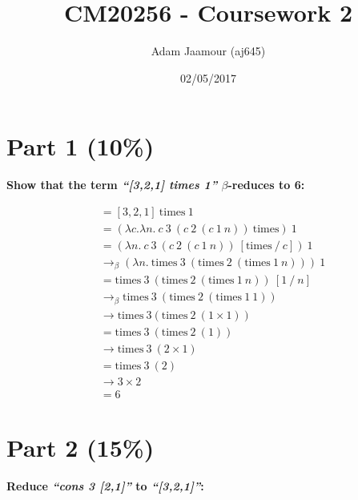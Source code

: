 \documentclass{article}
\title{CM20256 - Coursework 2}
\date{02/05/2017}
\author{Adam Jaamour (aj645)}
\begin{document}
	\newcommand{\lamb}{$\lambda$}
	\newcommand{\la}{\lambda}
	\newcommand{\be}{$\beta$}
	\newcommand{\tim}{\text{times}}
	\newcommand{\sa}{\quad}
	\newcommand{\equals}{\rightarrow_\beta}
	\newcommand{\equalsT}{\sa \rightarrow_\beta^*\sa}
	
	\maketitle
	\newpage
	
	
	\section{Part 1 (10\%)}
	\textbf{Show that the term \textit{``[3,2,1] times 1''} $\beta$-reduces to 6:}

	\begin{align*}
		&= [3,2,1] \ \tim \ 1 \\
		&= (\la c. \la n . \ c \ 3 \ (c \ 2 \ (c \ 1 \ n)) \ \tim ) \ 1 \\
		&= (\la n . \ c \ 3 \ (c \ 2 \ (c \ 1 \ n)) \ [\tim \ / \ c ]) \ 1 \\
		&\equals (\la n . \ \tim \ 3 \ (\tim \ 2 \ (\tim \ 1 \ n))) \ 1 \\
		&= \tim \ 3 \ (\tim \ 2 \ (\tim \ 1 \ n)) \ [1 \ / \ n] \\
		&\equals \tim \ 3 \ (\tim \ 2 \ (\tim \ 1 \ 1)) \\
		&\rightarrow \tim \ 3(\tim \ 2 \ (1 \times 1)) \\
		&= \tim \ 3 \ (\tim \ 2 \ (1)) \\
		&\rightarrow \tim \ 3 \ (2 \times 1) \\
		&= \tim \ 3 \ (2) \\
		&\rightarrow 3 \times 2 \\
		&= 6
	\end{align*}
	
	
	
	\section{Part 2 (15\%)}
	\textbf{Reduce \textit{``cons 3 [2,1]''} to \textit{``[3,2,1]''}:}
	
\end{document}

